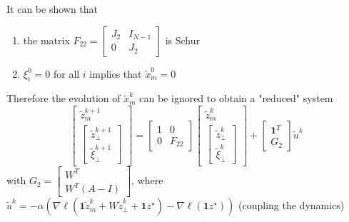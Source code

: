 \documentclass{book}
\newcommand{\fatone}{\boldsymbol{1}}
\newcommand{\fatl}{\boldsymbol{\ell}}
\theoremstyle{theoremv2}
\theoremstyle{defv2}
\theoremstyle{remark}
\theoremstyle{remark}
\theoremstyle{definition}
\theoremstyle{definition}
\begin{document}
It can be shown that 
\begin{enumerate}
    \item the matrix $F_{22} = \begin{bmatrix}
            J_2 & I_{N-1} \\ 0 & J_2
    \end{bmatrix}$ is Schur
\item $\xi_i^0 = 0$ for all $i$ implies that $\tilde{x}^0_m=0$
\end{enumerate}
Therefore the evolution of $\tilde{x}_m^k$ can be ignored to obtain a "reduced" system
\[
    \begin{bmatrix}
         \tilde{z}^{k+1}_m \\ \begin{bmatrix}
             \tilde{z}^{k+1}_\perp \\ \tilde{\xi}^{k+1}_\perp 
         \end{bmatrix}
    \end{bmatrix} = \begin{bmatrix}
        1 & 0 \\ 0 & F_{22}
    \end{bmatrix} \begin{bmatrix}
         \tilde{z}^{k}_m \\ \begin{bmatrix}
             \tilde{z}^{k}_\perp \\ \tilde{\xi}^{k}_\perp 
         \end{bmatrix}
    \end{bmatrix} + \begin{bmatrix}
        \fatone^T \\ G_2
    \end{bmatrix} \tilde{u}^k
\]
with $G_2 = \begin{bmatrix}
    W^T \\ W^T(A-I)
\end{bmatrix}$, where $\tilde{u}^k = -\alpha(\nabla\fatl(\fatone \tilde{z}^k_m + W \tilde{z}^k_\perp + \fatone z^\star)-\nabla\fatl(\fatone z^\star))$ (coupling the dynamics)
\end{document}
